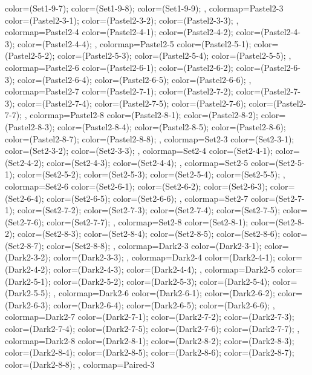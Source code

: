 {{  color=(Set1-9-7);
  color=(Set1-9-8);
  color=(Set1-9-9);
},
colormap={Pastel2-3}{
  color=(Pastel2-3-1);
  color=(Pastel2-3-2);
  color=(Pastel2-3-3);
},
colormap={Pastel2-4}{
  color=(Pastel2-4-1);
  color=(Pastel2-4-2);
  color=(Pastel2-4-3);
  color=(Pastel2-4-4);
},
colormap={Pastel2-5}{
  color=(Pastel2-5-1);
  color=(Pastel2-5-2);
  color=(Pastel2-5-3);
  color=(Pastel2-5-4);
  color=(Pastel2-5-5);
},
colormap={Pastel2-6}{
  color=(Pastel2-6-1);
  color=(Pastel2-6-2);
  color=(Pastel2-6-3);
  color=(Pastel2-6-4);
  color=(Pastel2-6-5);
  color=(Pastel2-6-6);
},
colormap={Pastel2-7}{
  color=(Pastel2-7-1);
  color=(Pastel2-7-2);
  color=(Pastel2-7-3);
  color=(Pastel2-7-4);
  color=(Pastel2-7-5);
  color=(Pastel2-7-6);
  color=(Pastel2-7-7);
},
colormap={Pastel2-8}{
  color=(Pastel2-8-1);
  color=(Pastel2-8-2);
  color=(Pastel2-8-3);
  color=(Pastel2-8-4);
  color=(Pastel2-8-5);
  color=(Pastel2-8-6);
  color=(Pastel2-8-7);
  color=(Pastel2-8-8);
},
colormap={Set2-3}{
  color=(Set2-3-1);
  color=(Set2-3-2);
  color=(Set2-3-3);
},
colormap={Set2-4}{
  color=(Set2-4-1);
  color=(Set2-4-2);
  color=(Set2-4-3);
  color=(Set2-4-4);
},
colormap={Set2-5}{
  color=(Set2-5-1);
  color=(Set2-5-2);
  color=(Set2-5-3);
  color=(Set2-5-4);
  color=(Set2-5-5);
},
colormap={Set2-6}{
  color=(Set2-6-1);
  color=(Set2-6-2);
  color=(Set2-6-3);
  color=(Set2-6-4);
  color=(Set2-6-5);
  color=(Set2-6-6);
},
colormap={Set2-7}{
  color=(Set2-7-1);
  color=(Set2-7-2);
  color=(Set2-7-3);
  color=(Set2-7-4);
  color=(Set2-7-5);
  color=(Set2-7-6);
  color=(Set2-7-7);
},
colormap={Set2-8}{
  color=(Set2-8-1);
  color=(Set2-8-2);
  color=(Set2-8-3);
  color=(Set2-8-4);
  color=(Set2-8-5);
  color=(Set2-8-6);
  color=(Set2-8-7);
  color=(Set2-8-8);
},
colormap={Dark2-3}{
  color=(Dark2-3-1);
  color=(Dark2-3-2);
  color=(Dark2-3-3);
},
colormap={Dark2-4}{
  color=(Dark2-4-1);
  color=(Dark2-4-2);
  color=(Dark2-4-3);
  color=(Dark2-4-4);
},
colormap={Dark2-5}{
  color=(Dark2-5-1);
  color=(Dark2-5-2);
  color=(Dark2-5-3);
  color=(Dark2-5-4);
  color=(Dark2-5-5);
},
colormap={Dark2-6}{
  color=(Dark2-6-1);
  color=(Dark2-6-2);
  color=(Dark2-6-3);
  color=(Dark2-6-4);
  color=(Dark2-6-5);
  color=(Dark2-6-6);
},
colormap={Dark2-7}{
  color=(Dark2-7-1);
  color=(Dark2-7-2);
  color=(Dark2-7-3);
  color=(Dark2-7-4);
  color=(Dark2-7-5);
  color=(Dark2-7-6);
  color=(Dark2-7-7);
},
colormap={Dark2-8}{
  color=(Dark2-8-1);
  color=(Dark2-8-2);
  color=(Dark2-8-3);
  color=(Dark2-8-4);
  color=(Dark2-8-5);
  color=(Dark2-8-6);
  color=(Dark2-8-7);
  color=(Dark2-8-8);
},
colormap={Paired-3}{
}}
